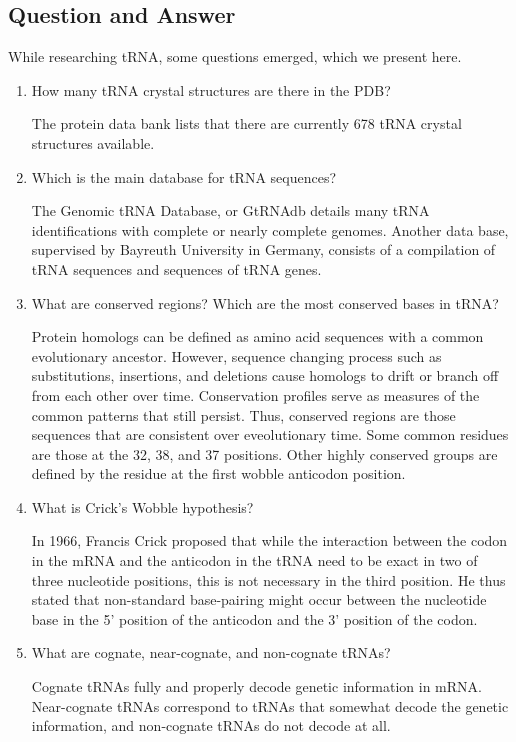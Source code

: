 \documentclass[pdftex, 12pt]{article}
\begin{document}
\subsection{Question and Answer}
While researching tRNA, some questions emerged, which we present here. 
\begin{enumerate}
\item
How many tRNA crystal structures are there in the PDB?

The protein data bank lists that there are currently 678 tRNA crystal structures available. 
\item
Which is the main database for tRNA sequences?

The Genomic tRNA Database, or GtRNAdb details many tRNA identifications with complete or nearly complete genomes. Another data base, supervised by Bayreuth University in Germany, consists of a compilation of tRNA sequences and sequences of tRNA genes. 
\item
What are conserved regions? Which are the most conserved bases in tRNA?

Protein homologs can be defined as amino acid sequences with a common evolutionary ancestor. However, sequence changing process such as substitutions, insertions, and deletions cause homologs to drift or branch off from each other over time. Conservation profiles serve as measures of the common patterns that still persist.\cite{Vries2008} Thus, conserved regions are those sequences that are consistent over eveolutionary time. Some common residues are those at the 32, 38, and 37 positions. Other highly conserved groups are defined by the residue at the first wobble anticodon position.\cite{saks2007}  
\item
What is Crick's Wobble hypothesis?

In 1966, Francis Crick proposed that while the interaction between the codon in the mRNA and the anticodon in the tRNA need to be exact in two of three nucleotide positions, this is not necessary in the third position. He thus stated that non-standard base-pairing might occur between the nucleotide base in the 5' position of the anticodon and the 3' position of the codon.\cite{crick1966}
\item
What are cognate, near-cognate, and non-cognate tRNAs?

Cognate tRNAs fully and properly decode genetic information in mRNA. Near-cognate tRNAs correspond to tRNAs that somewhat decode the genetic information, and non-cognate tRNAs do not decode at all. 

\end{enumerate}

 


	
\end{document}
